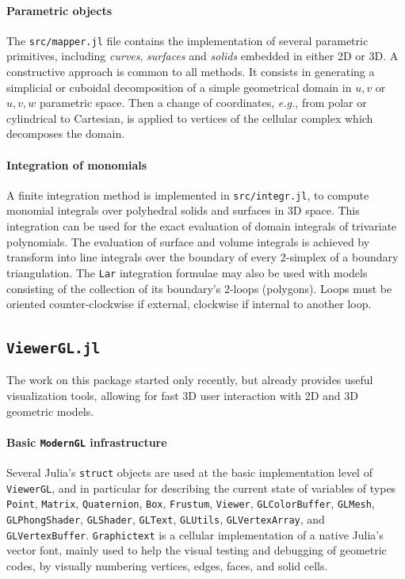\documentclass{juliacon}
\begin{document}
\paragraph*{Parametric objects}
The \texttt{src/mapper.jl} file contains the implementation of several
parametric primitives, including \emph{curves}, \emph{surfaces} and \emph{solids} embedded in
either 2D or 3D.
A constructive approach is common to all methods. It consists in
generating a simplicial or cuboidal decomposition of a simple
geometrical domain in ${u,v}$ or ${u,v,w}$ parametric space. Then
a change of coordinates, \emph{e.g.}, from polar or cylindrical
to Cartesian, is applied to vertices of the cellular complex which
decomposes the domain.

\paragraph*{Integration of monomials}
A finite integration method is implemented in \texttt{src/integr.jl}, to compute
monomial integrals over polyhedral solids and surfaces in
3D space. This integration can be used for the exact evaluation of
domain integrals of trivariate polynomials.
The evaluation of surface and volume integrals is achieved by
transform into line integrals over the boundary of every 2-simplex
of a boundary triangulation. The \texttt{Lar} integration formulae 
may also be used with models consisting of the collection of its boundary's 2-loops (polygons).
Loops must be oriented counter-clockwise if external, clockwise if internal
to another loop. 

\subsection{\texttt{ViewerGL.jl}}
The work on this package started only recently, but already provides useful visualization tools, allowing for fast 3D user interaction with 2D and 3D geometric models.

\paragraph*{Basic \texttt{ModernGL} infrastructure} Several Julia's \texttt{struct} objects are used at the basic implementation level of \texttt{ViewerGL}, and in particular for describing the current state of variables of  types  \texttt{Point}, \texttt{Matrix}, \texttt{Quaternion}, \texttt{Box}, \texttt{Frustum}, \texttt{Viewer}, \texttt{GLColorBuffer}, \texttt{GLMesh}, \texttt{GLPhongShader}, \texttt{GLShader}, \texttt{GLText}, \texttt{GLUtils}, \texttt{GLVertexArray}, and \texttt{GLVertexBuffer}.
\texttt{Graphictext} is a cellular implementation of a native Julia's vector font, mainly used to help  the visual testing and debugging of geometric codes, by visually numbering vertices, edges, faces, and solid cells.   
\end{document}
